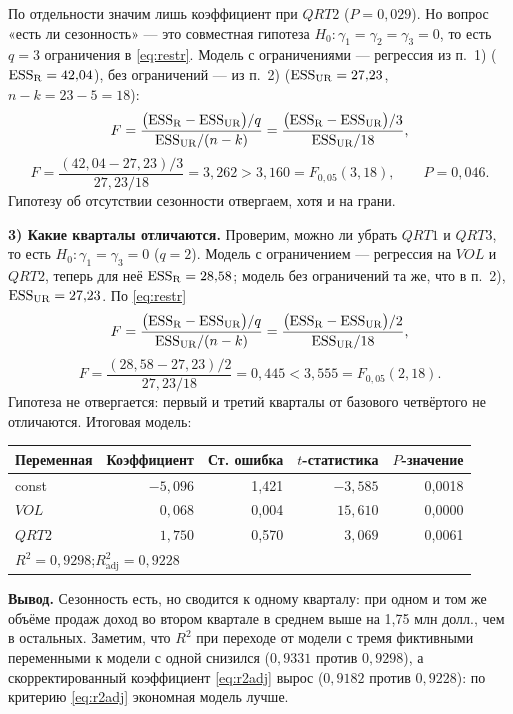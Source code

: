 \begin{solution}
\noindent По отдельности значим лишь коэффициент при $\mathit{QRT}2$
($P = 0{,}029$). Но вопрос «есть ли сезонность» — это совместная гипотеза
$H_0\colon \gamma_1 = \gamma_2 = \gamma_3 = 0$, то есть $q = 3$ ограничения в
\eqref{eq:restr}. Модель с ограничениями — регрессия из п.~1)
($\mathrm{ESS}_{\mathrm{R}} = 42{,}04$), без ограничений — из п.~2)
($\mathrm{ESS}_{\mathrm{UR}} = 27{,}23$, $n - k = 23 - 5 = 18$):
\[
  F = \frac{\bigl(\mathrm{ESS}_{\mathrm{R}} - \mathrm{ESS}_{\mathrm{UR}}\bigr)/q}
           {\mathrm{ESS}_{\mathrm{UR}}/(n-k)}
    = \frac{\bigl(\mathrm{ESS}_{\mathrm{R}} - \mathrm{ESS}_{\mathrm{UR}}\bigr)/3}
           {\mathrm{ESS}_{\mathrm{UR}}/18},
\]
\[
  F = \frac{(42{,}04 - 27{,}23)/3}{27{,}23/18} = 3{,}262 > 3{,}160 = F_{0{,}05}(3, 18),
  \qquad P = 0{,}046 .
\]
Гипотезу об отсутствии сезонности отвергаем, хотя и на грани.

\medskip
\textbf{3) Какие кварталы отличаются.} Проверим, можно ли убрать
$\mathit{QRT}1$ и $\mathit{QRT}3$, то есть $H_0\colon \gamma_1 = \gamma_3 = 0$
($q = 2$). Модель с ограничением — регрессия на $\mathit{VOL}$ и
$\mathit{QRT}2$, теперь для неё $\mathrm{ESS}_{\mathrm{R}} = 28{,}58$; модель без
ограничений та же, что в п.~2), $\mathrm{ESS}_{\mathrm{UR}} = 27{,}23$. По
\eqref{eq:restr}
\[
  F = \frac{\bigl(\mathrm{ESS}_{\mathrm{R}} - \mathrm{ESS}_{\mathrm{UR}}\bigr)/q}
           {\mathrm{ESS}_{\mathrm{UR}}/(n-k)}
    = \frac{\bigl(\mathrm{ESS}_{\mathrm{R}} - \mathrm{ESS}_{\mathrm{UR}}\bigr)/2}
           {\mathrm{ESS}_{\mathrm{UR}}/18},
\]
\[
  F = \frac{(28{,}58 - 27{,}23)/2}{27{,}23/18} = 0{,}445 < 3{,}555 = F_{0{,}05}(2, 18).
\]
Гипотеза не отвергается: первый и третий кварталы от базового четвёртого не
отличаются. Итоговая модель:
\begin{center}
\begin{tabular}{lrrrr}
\toprule
Переменная & Коэффициент & Ст. ошибка & $t$-статистика & $P$-значение \\
\midrule
const           & $-5{,}096$ & 1,421 & $-3{,}585$ & 0,0018 \\
$\mathit{VOL}$  & $\phantom{-}0{,}068$ & 0,004 & $15{,}610$ & 0,0000 \\
$\mathit{QRT}2$ & $\phantom{-}1{,}750$ & 0,570 & $\phantom{-}3{,}069$ & 0,0061 \\
\midrule
\multicolumn{5}{l}{$R^2 = 0{,}9298$;\quad $R^2_{\text{adj}} = 0{,}9228$} \\
\bottomrule
\end{tabular}
\end{center}

\noindent\textbf{Вывод.} Сезонность есть, но сводится к одному кварталу: при
одном и том же объёме продаж доход во втором квартале в среднем выше на
1,75 млн долл., чем в остальных. Заметим, что $R^2$ при переходе от модели с
тремя фиктивными переменными к модели с одной снизился ($0{,}9331$ против
$0{,}9298$), а скорректированный коэффициент \eqref{eq:r2adj} вырос
($0{,}9182$ против $0{,}9228$): по критерию \eqref{eq:r2adj} экономная модель
лучше.
\end{solution}
